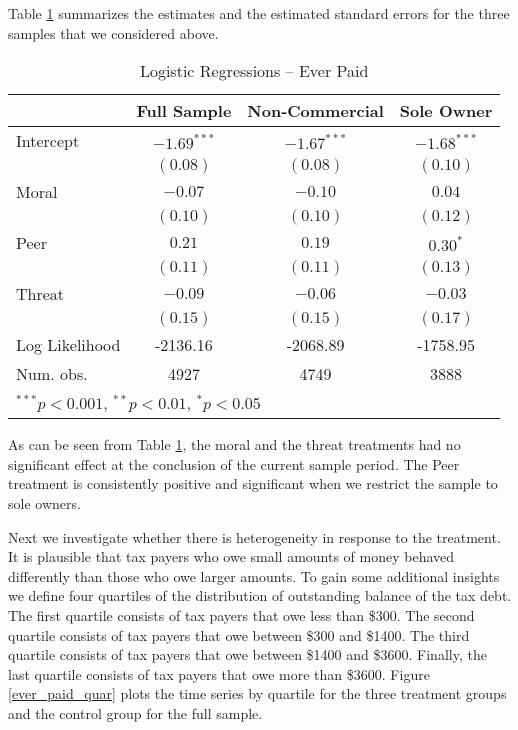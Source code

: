 \documentclass[12pt,titlepage]{article}
\begin{document}
Table \ref{XX} summarizes the estimates and the estimated standard
errors for the three samples that we considered above.
  
\begin{table}[htbp]
\caption{Logistic Regressions -- Ever Paid}\label{XX}
\begin{center}
\begin{tabular}{l c c c }
\hline
               & Full Sample & Non-Commercial & Sole Owner \\
\hline
Intercept      & $-1.69^{***}$ & $-1.67^{***}$ & $-1.68^{***}$ \\
               & $(0.08)$      & $(0.08)$      & $(0.10)$      \\
Moral          & $-0.07$       & $-0.10$       & $0.04$        \\
               & $(0.10)$      & $(0.10)$      & $(0.12)$      \\
Peer           & $0.21$        & $0.19$        & $0.30^{*}$    \\
               & $(0.11)$      & $(0.11)$      & $(0.13)$      \\
Threat         & $-0.09$       & $-0.06$       & $-0.03$       \\
               & $(0.15)$      & $(0.15)$      & $(0.17)$      \\
\hline
Log Likelihood & -2136.16      & -2068.89      & -1758.95      \\
Num. obs.      & 4927          & 4749          & 3888          \\
\hline
\multicolumn{4}{l}{\scriptsize{$^{***}p<0.001$, $^{**}p<0.01$, $^*p<0.05$}}
\end{tabular}
\end{center}
\end{table}

  
As can be seen from Table \ref{XX}, the moral and the threat
treatments had no significant effect at the conclusion of the current
sample period. The Peer treatment is consistently positive and
significant when we restrict the sample to sole owners.

Next we investigate whether there is heterogeneity in response to the
treatment. It is plausible that tax payers who owe small amounts of
money behaved differently than those who owe larger amounts. To gain
some additional insights we define four quartiles of the distribution
of outstanding balance of the tax debt. The first quartile consists of
tax payers that owe less than \$300. The second quartile consists of
tax payers that owe between \$300 and \$1400. The third quartile
consists of tax payers that owe between \$1400 and \$3600. Finally,
the last quartile consists of tax payers that owe more than \$3600.
Figure \ref{ever_paid_quar} plots the time series by quartile for the
three treatment groups and the control group for the full sample.
\end{document}
